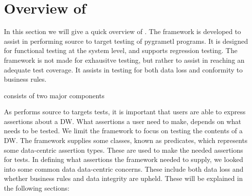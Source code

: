 \section{Overview of \FW{}}
In this section we will give a quick overview of \FW{}. The framework is developed to assist in performing source to target testing of pygrametl programs. It is designed for functional testing at the system level, and supports regression testing. The framework is not made for exhausitve testing, but rather to assist in reaching an adequate test coverage. It assists in testing for both data loss and conformity to business rules.

\FW{} consists of two major components

As \FW{} performs source to targets tests, it is important that users are able to express assertions about a DW. What assertions a user need to make, depends on what needs to be tested. We limit the framework to focus on testing the contents of a DW. The framework supplies some classes, known as predicates, which represents some data-centric assertion types. These are used to make the needed assertions for tests. In defining what assertions the framework needed to supply, we looked into some common data data-centric concerns. These include both data loss and whether business rules and data integrity are upheld.  These will be explained in the following sections: 







